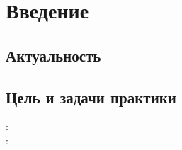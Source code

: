 \documentclass[11pt]{article}    %
\begin{document}
\tableofcontents
\newpage

\section{Введение}
\subsection{Актуальность}
%
%
%
\subsection{Цель и задачи практики}

{:} 
\\

{:} 
\end{document}
